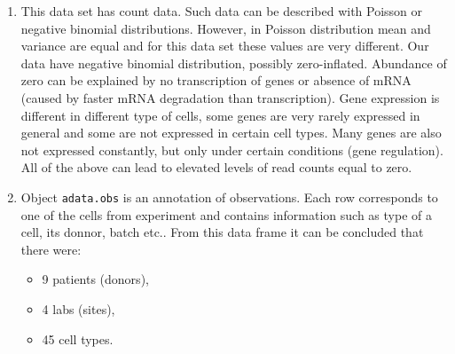 \documentclass[12pt]{article}
\begin{document}
\begin{enumerate}
\item This data set has count data. Such data can be described with Poisson or negative binomial distributions. However, in Poisson distribution mean and variance are equal and for this data set these values are very different. Our data have negative binomial distribution, possibly zero-inflated. Abundance of zero can be explained by no transcription of genes or absence of mRNA (caused by faster mRNA degradation than transcription). Gene expression is different in different type of cells, some genes are very rarely expressed in general and some are not expressed in certain cell types. Many genes are also not expressed constantly, but only under certain conditions (gene regulation). All of the above can lead to elevated levels of read counts equal to zero. 

\item Object \texttt{adata.obs} is an annotation of observations. Each row corresponds to one of the cells from experiment and contains information such as type of a cell, its donnor, batch etc.. From this data frame it can be concluded that there were:

\begin{itemize}
\item 9 patients (donors),
\item 4 labs (sites),
\item 45 cell types.
\end{itemize}
\end{enumerate}
\end{document}
